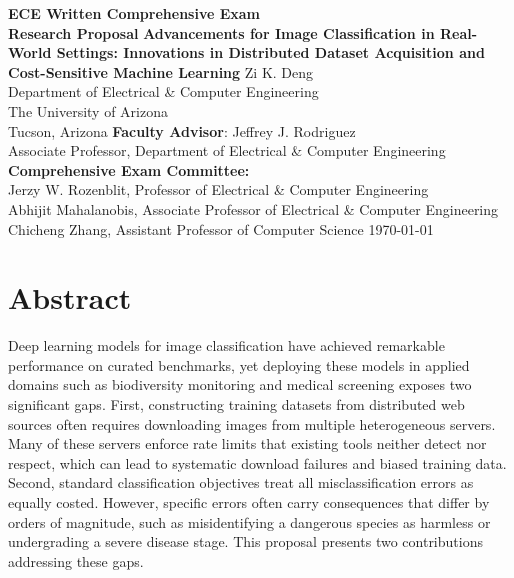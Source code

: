 \documentclass[11pt, letterpaper]{article}
\newcommand{\proposaltitle}{Advancements for Image Classification in Real-World Settings: Innovations in Distributed Dataset Acquisition and Cost-Sensitive Machine Learning}
\newcommand{\studentname}{Zi K. Deng}
\newcommand{\advisorname}{Jeffrey J. Rodriguez}
\newcommand{\advisortitle}{Associate Professor}
\newcommand{\departmentname}{Department of Electrical \& Computer Engineering}
\newcommand{\universityname}{The University of Arizona}
\newcommand{\proposaldate}{\today}
\begin{document}
\begin{titlepage}
\centering
\vfill
{\LARGE \textbf{ECE Written Comprehensive Exam\\[6pt] Research Proposal}}
\vfill
{\Large \textbf{\proposaltitle}}
\vfill
{\large \studentname \\[6pt] \departmentname \\[4pt] \universityname \\[4pt] Tucson, Arizona}
\vfill
{\large \textbf{Faculty Advisor}: \advisorname \\[4pt] \advisortitle, \departmentname}
\vfill
{\large \textbf{Comprehensive Exam Committee:}\\[6pt]
Jerzy W. Rozenblit, Professor of Electrical \& Computer Engineering \\[4pt]
Abhijit Mahalanobis, Associate Professor of Electrical \& Computer Engineering \\[4pt]
Chicheng Zhang, Assistant Professor of Computer Science}
\vfill
{\large \proposaldate}
\vfill
\end{titlepage}

\section*{Abstract}

Deep learning models for image classification have achieved remarkable
performance on curated benchmarks, yet deploying these models in applied
domains such as biodiversity monitoring and medical screening exposes two significant gaps. First, constructing training datasets from
distributed web sources often requires downloading images from multiple
heterogeneous servers. Many of these servers enforce rate limits that
existing tools neither detect nor respect, which can lead to systematic download
failures and biased training data. Second, standard classification objectives
treat all misclassification errors as equally costed. However, specific errors often carry consequences that differ by orders
of magnitude, such as misidentifying a dangerous species as harmless or
undergrading a severe disease stage. This proposal presents two contributions addressing
these gaps.
\end{document}
